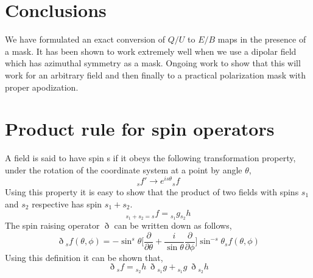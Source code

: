 \documentclass[prd,amsmath,amssymb,floatfix,nofootinbib,preprintnumbers,twocolumn]{revtex4}%
\newcommand{\beq}{\begin{equation}}
\newcommand{\eeq}{\end{equation}}
\begin{document}
\section{Conclusions}

We have formulated an exact conversion of $Q/U$ to $E/B$ maps in the presence of a mask. It has been shown to work extremely well when we use a dipolar field which has azimuthal symmetry as a mask. Ongoing work to show that  this will work for an arbitrary field and then finally to a practical polarization mask with proper apodization.

\appendix
\section{Product rule for spin operators}

A field is said to have spin s if it obeys the following transformation property, under the rotation of the coordinate system at a point by angle $\theta$,
%
\beq
_s f' \rightarrow e^{is\theta} {_s} f
\eeq 
%
Using this property it is easy to show that the product of two fields with spins $s_1$ and $s_2$ respective has spin $s_1 + s_2$.
%
\beq
_{s_1 +s_2=s}f ={_{s_1}} g {_{s_2}}h
\eeq
%
The spin raising operator $\eth$ can be written down as follows,
%
\beq
\eth {_{s}}f(\theta,\phi) = -\sin^s\theta \bigg[ \frac{\partial}{\partial \theta} + \frac{i}{\sin\theta} \frac{\partial}{\partial \phi} \bigg] \sin^{-s}\theta {_s}f(\theta,\phi) 
\eeq
%
Using this definition it can be shown that,
%
\beq
\eth {_{s}}f = {_{s_2}}h~ \eth {_{s_1}}g  + {_{s_1}}g~\eth{_{s_2}}h
\eeq
%
\end{document}
